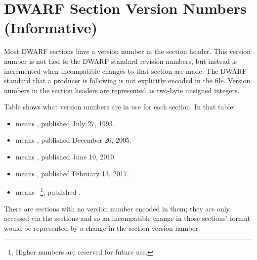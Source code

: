 
\chapter[Section Version Numbers (Informative)]{DWARF Section Version Numbers (Informative)}
\label{app:dwarfsectionversionnumbersinformative}

Most DWARF sections have a version number in the section
header. This version number is not tied to the DWARF standard
revision numbers, but instead is incremented when incompatible
changes to that section are made. The DWARF standard that
a producer is following is not explicitly encoded in the
file. Version numbers in the section headers are represented
\bb
as two-byte unsigned integers.
\eb

Table 
shows what version
numbers are in use for each section. In that table:
\begin{itemize}
\setlength{\itemsep}{0em}
\item  {} means , published July 27, 1993.
\item  {} means , published December 20, 2005.
\item  {} means , published June 10, 2010.
\item  {} means , published February 13, 2017.
\item

		\bb
		 means\ \eb
		    \footnote{
				Higher numbers are reserved for future use.},
			published .

\end{itemize}

There are sections with no version number encoded in them;
they are only accessed via the
\dotdebuginfo{}
sections and so an incompatible change in those sections'
format would be represented by a change in the
\dotdebuginfo{} section version number.

